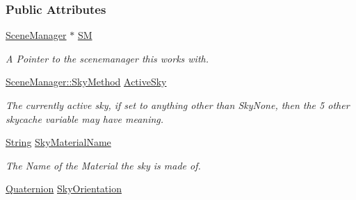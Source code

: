 \subsubsection*{Public Attributes}
\begin{DoxyCompactItemize}
\item 
\hypertarget{classphys_1_1internal_1_1SceneManagerData_afd470b7bdba16d0840ce18bb1846fa82}{
\hyperlink{classphys_1_1SceneManager}{SceneManager} $\ast$ \hyperlink{classphys_1_1internal_1_1SceneManagerData_afd470b7bdba16d0840ce18bb1846fa82}{SM}}
\label{d7/dbb/classphys_1_1internal_1_1SceneManagerData_afd470b7bdba16d0840ce18bb1846fa82}

\begin{DoxyCompactList}\small\item\em A Pointer to the scenemanager this works with. \item\end{DoxyCompactList}\item 
\hypertarget{classphys_1_1internal_1_1SceneManagerData_a1106e747889ca1b177c33dbe1ea9f775}{
\hyperlink{classphys_1_1SceneManager_a91dd086aabaab926d070c65fc14828d6}{SceneManager::SkyMethod} \hyperlink{classphys_1_1internal_1_1SceneManagerData_a1106e747889ca1b177c33dbe1ea9f775}{ActiveSky}}
\label{d7/dbb/classphys_1_1internal_1_1SceneManagerData_a1106e747889ca1b177c33dbe1ea9f775}

\begin{DoxyCompactList}\small\item\em The currently active sky, if set to anything other than SkyNone, then the 5 other skycache variable may have meaning. \item\end{DoxyCompactList}\item 
\hypertarget{classphys_1_1internal_1_1SceneManagerData_a5a450396db70a6705fc0625aab1fb047}{
\hyperlink{namespacephys_aa03900411993de7fbfec4789bc1d392e}{String} \hyperlink{classphys_1_1internal_1_1SceneManagerData_a5a450396db70a6705fc0625aab1fb047}{SkyMaterialName}}
\label{d7/dbb/classphys_1_1internal_1_1SceneManagerData_a5a450396db70a6705fc0625aab1fb047}

\begin{DoxyCompactList}\small\item\em The Name of the Material the sky is made of. \item\end{DoxyCompactList}\item 
\hypertarget{classphys_1_1internal_1_1SceneManagerData_af28e91e743235d1950527bec3071d59a}{
\hyperlink{classphys_1_1Quaternion}{Quaternion} \hyperlink{classphys_1_1internal_1_1SceneManagerData_af28e91e743235d1950527bec3071d59a}{SkyOrientation}}
\label{d7/dbb/classphys_1_1internal_1_1SceneManagerData_af28e91e743235d1950527bec3071d59a}


\end{DoxyCompactItemize}
